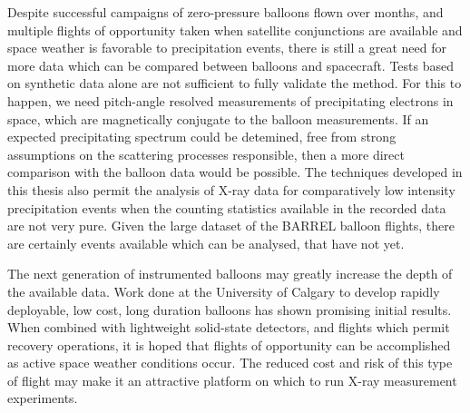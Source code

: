 Despite successful campaigns of zero-pressure balloons flown over months, and multiple flights of opportunity taken when satellite conjunctions are available and space weather is favorable to precipitation events, there is still a great need for more data which can be compared between balloons and spacecraft. Tests based on synthetic data alone are not sufficient to fully validate the method. For this to happen, we need pitch-angle resolved measurements of precipitating electrons in space, which are magnetically conjugate to the balloon measurements. If an expected precipitating spectrum could be detemined, free from strong assumptions on the scattering processes responsible, then a more direct comparison with the balloon data would be possible. The techniques developed in this thesis also permit the analysis of X-ray data for comparatively low intensity precipitation events when the counting statistics available in the recorded data are not very pure. Given the large dataset of the BARREL balloon flights, there are certainly events available which can be analysed, that have not yet. 

The next generation of instrumented balloons may greatly increase the depth of the available data. Work done at the University of Calgary to develop rapidly deployable, low cost, long duration balloons has shown promising initial results. When combined with lightweight solid-state detectors, and flights which permit recovery operations, it is hoped that flights of opportunity can be accomplished as active space weather conditions occur. The reduced cost and risk of this type of flight may make it an attractive platform on which to run X-ray measurement experiments. 




